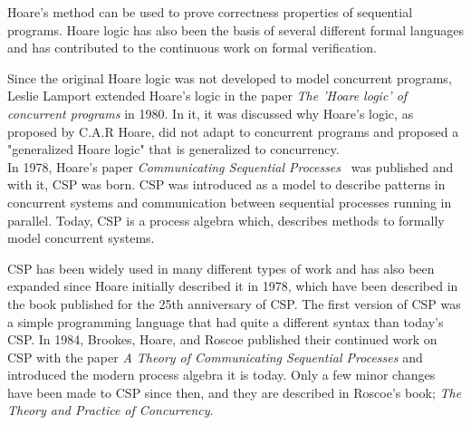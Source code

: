Hoare's method can be used to prove correctness properties of sequential programs. Hoare logic has also been the basis of several different formal languages and has contributed to the continuous work on formal verification.

Since the original Hoare logic was not developed to model concurrent programs, Leslie Lamport extended Hoare's logic in the paper \textit{The 'Hoare logic' of concurrent programs}\cite{Lamport1980} in 1980. In it, it was discussed why Hoare's logic, as proposed by C.A.R Hoare, did not adapt to concurrent programs and proposed a "generalized Hoare logic" that is generalized to concurrency. \\

In 1978, Hoare's paper \textit{Communicating Sequential Processes}~\cite{Hoare1978} was published and with it, CSP was born.
CSP was introduced as a model to describe patterns in concurrent systems and communication between sequential processes running in parallel. Today, CSP is a process algebra which, describes methods to formally model concurrent systems.

CSP has been widely used in many different types of work and has also been expanded since Hoare initially described it in 1978, which have been described in the book\cite{Abdallah2005} published for the 25th anniversary of CSP.
The first version of CSP was a simple programming language that had quite a different syntax than today's CSP. In 1984, Brookes, Hoare, and Roscoe published their continued work on CSP with the paper \textit{A Theory of Communicating Sequential Processes}\cite{Brookes1984} and introduced the modern process algebra it is today. Only a few minor changes have been made to CSP since then, and they are described in Roscoe's book; \textit{The Theory and Practice of Concurrency}\cite{Roscoe1997}.\\

